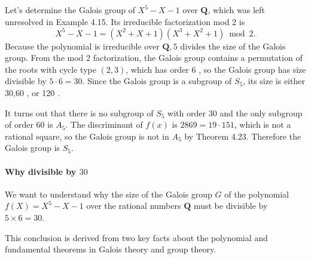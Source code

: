 Let's determine the Galois group of $X^5-X-1$ over $\mathbf{Q}$, which was left unresolved in Example 4.15. Its irreducible factorization mod 2 is
\[
X^5-X-1=\left(X^2+X+1\right)\left(X^3+X^2+1\right) \bmod 2 .
\]
Because the polynomial is irreducible over $\mathbf{Q}, 5$ divides the size of the Galois group. From the mod 2 factorization, the Galois group contains a permutation of the roots with cycle type $(2,3)$, which has order 6 , so the Galois group has size divisible by $5 \cdot 6=30$. Since the Galois group is a subgroup of $S_5$, its size is either 30,60 , or 120 .

It turns out that there is no subgroup of $S_5$ with order 30 and the only subgroup of order 60 is $A_5$. The discriminant of $f(x)$ is $2869=19 \cdot 151$, which is not a rational square, so the Galois group is not in $A_5$ by Theorem 4.23. Therefore the Galois group is $S_5$.

\paragraph{Why divisible by \texorpdfstring{$30$}{30}}

We want to understand why the size of the Galois group $G$ of the polynomial $f(X) = X^5 - X - 1$ over the rational numbers $\mathbf{Q}$ must be divisible by $5 \times 6 = 30$.

This conclusion is derived from two key facts about the polynomial and fundamental theorems in Galois theory and group theory.

